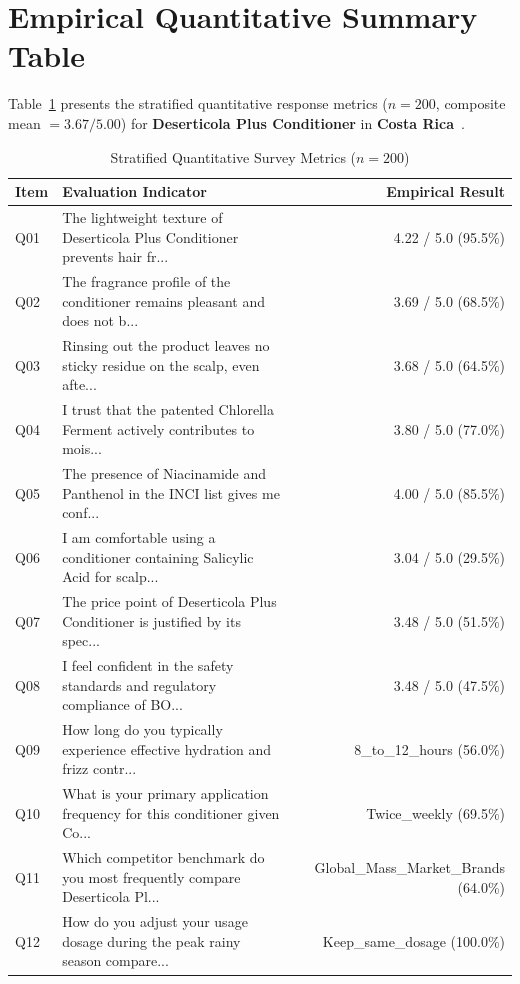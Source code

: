 \documentclass[10pt,twocolumn,a4paper]{article}
\begin{document}
\section{Empirical Quantitative Summary Table}
Table~\ref{tab:metrics} presents the stratified quantitative response metrics ($n = 200$, composite mean $= 3.67/5.00$) for \textbf{Deserticola Plus Conditioner} in \textbf{Costa Rica}~\cite{ref_kaggle_doi,ref_hf_doi}.

\begin{table}[t]
\centering
\caption{Stratified Quantitative Survey Metrics ($n = 200$)}
\label{tab:metrics}
\small
\begin{tabularx}{\textwidth}{l X r}
\toprule
\textbf{Item} & \textbf{Evaluation Indicator} & \textbf{Empirical Result} \\
\midrule
Q01 & The lightweight texture of Deserticola Plus Conditioner prevents hair fr... & 4.22 / 5.0 (95.5\%) \\
Q02 & The fragrance profile of the conditioner remains pleasant and does not b... & 3.69 / 5.0 (68.5\%) \\
Q03 & Rinsing out the product leaves no sticky residue on the scalp, even afte... & 3.68 / 5.0 (64.5\%) \\
Q04 & I trust that the patented Chlorella Ferment actively contributes to mois... & 3.80 / 5.0 (77.0\%) \\
Q05 & The presence of Niacinamide and Panthenol in the INCI list gives me conf... & 4.00 / 5.0 (85.5\%) \\
Q06 & I am comfortable using a conditioner containing Salicylic Acid for scalp... & 3.04 / 5.0 (29.5\%) \\
Q07 & The price point of Deserticola Plus Conditioner is justified by its spec... & 3.48 / 5.0 (51.5\%) \\
Q08 & I feel confident in the safety standards and regulatory compliance of BO... & 3.48 / 5.0 (47.5\%) \\
Q09 & How long do you typically experience effective hydration and frizz contr... & 8\_to\_12\_hours (56.0\%) \\
Q10 & What is your primary application frequency for this conditioner given Co... & Twice\_weekly (69.5\%) \\
Q11 & Which competitor benchmark do you most frequently compare Deserticola Pl... & Global\_Mass\_Market\_Brands (64.0\%) \\
Q12 & How do you adjust your usage dosage during the peak rainy season compare... & Keep\_same\_dosage (100.0\%) \\

\end{tabularx}
\end{table}
\end{document}
